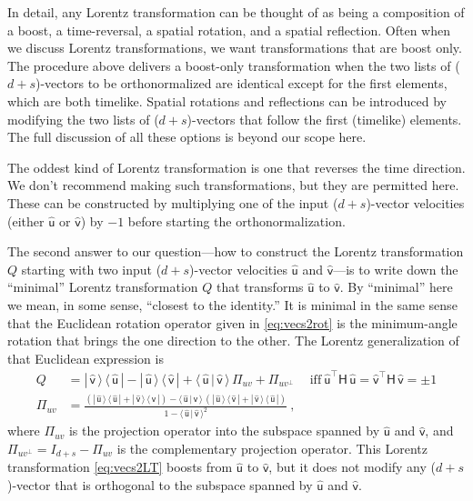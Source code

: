 \documentclass{article}
\newcommand{\metric}{\mathsf{H}}
\newcommand{\proj}{\mathsf{\Pi}}
\newcommand{\Lhat}[1]{\hat{\mathsf{#1}}} %
\newcommand{\braket}[2]{\langle\,{#1}\,|\,{#2}\,\rangle}
\newcommand{\ketbra}[2]{|\,{#1}\,\rangle\,\langle\,{#2}\,|}
\newcommand{\plus}{\!+\!} %
\begin{document}
In detail, any Lorentz transformation can be thought of as being a composition of a boost, a time-reversal, a spatial rotation, and a spatial reflection.
Often when we discuss Lorentz transformations, we want transformations that are boost only.
The procedure above delivers a boost-only transformation when the two lists of ($d\plus s$)-vectors to be orthonormalized are identical except for the first elements, which are both timelike.
Spatial rotations and reflections can be introduced by modifying the two lists of ($d\plus s$)-vectors that follow the first (timelike) elements.
The full discussion of all these options is beyond our scope here.

The oddest kind of Lorentz transformation is one that reverses the time direction.
We don't recommend making such transformations, but they are permitted here.
These can be constructed by multiplying one of the input ($d\plus s$)-vector velocities (either $\Lhat{u}$ or $\Lhat{v}$) by $-1$ before starting the orthonormalization.

The second answer to our question---how to construct the Lorentz transformation $Q$ starting with two input ($d\plus s$)-vector velocities $\Lhat{u}$ and $\Lhat{v}$---is to write down the ``minimal'' Lorentz transformation $Q$ that transforms $\Lhat{u}$ to $\Lhat{v}$.
By ``minimal'' here we mean, in some sense, ``closest to the identity.''
It is minimal in the same sense that the Euclidean rotation operator given in \eqref{eq:vecs2rot} is the minimum-angle rotation that brings the one direction to the other.
The Lorentz generalization of that Euclidean expression is
\begin{align}
    Q &= \ketbra{\Lhat{v}}{\Lhat{u}} - \ketbra{\Lhat{u}}{\Lhat{v}} + \braket{\Lhat{u}}{\Lhat{v}}\,\proj_{uv} + \proj_{uv^\perp} \quad~ \mbox{iff} ~ \Lhat{u}^\top\metric\,\Lhat{u} = \Lhat{v}^\top\metric\,\Lhat{v} = \pm 1 \label{eq:vecs2LT} \\
    \proj_{uv} &= \frac{\left(\ketbra{\Lhat{u}}{\Lhat{u}} + \ketbra{\Lhat{v}}{\Lhat{v}}\right) - \braket{\Lhat{u}}{\Lhat{v}}\,\left(\ketbra{\Lhat{u}}{\Lhat{v}} + \ketbra{\Lhat{v}}{\Lhat{u}}\right)}{1 - \braket{\Lhat{u}}{\Lhat{v}}^2} ~,
\end{align}
where $\proj_{uv}$ is the projection operator into the subspace spanned by $\Lhat{u}$ and $\Lhat{v}$,
and $\proj_{uv^\perp} = I_{d+s} - \proj_{uv}$ is the complementary projection operator.
This Lorentz transformation \eqref{eq:vecs2LT} boosts from $\Lhat{u}$ to $\Lhat{v}$, but it does not modify any ($d\plus s$)-vector that is orthogonal to the subspace spanned by $\Lhat{u}$ and $\Lhat{v}$.
\end{document}
